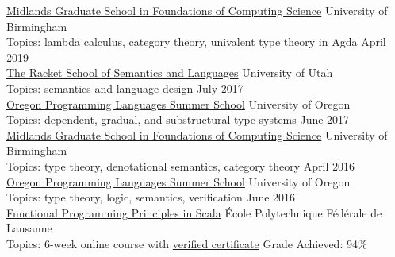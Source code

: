 \documentclass[margin,line]{resume}
\begin{document}
\begin{resume}
\newcommand\ssitem[5]{\href{#1}{#2} \hfill #3 \\ Topics: #4 \hfill #5}

\ssitem
{http://events.cs.bham.ac.uk/mgs2019/}
{Midlands Graduate School in Foundations of Computing Science}
{University of Birmingham}
{lambda calculus, category theory, univalent type theory in Agda}
{April 2019}\\[\mymedskip] %
\ssitem
{https://summer-school.racket-lang.org/2017/}
{The Racket School of Semantics and Languages}
{University of Utah}
{semantics and language design}
{July 2017}\\[\mymedskip] %
\ssitem
{https://www.cs.uoregon.edu/research/summerschool/summer17}
{Oregon Programming Languages Summer School}
{University of Oregon}
{dependent, gradual, and substructural type systems}
{June 2017}\\[\mymedskip] %
\ssitem
{http://www.cs.bham.ac.uk/~pbl/mgs2016/}
{Midlands Graduate School in Foundations of Computing Science}
{University of Birmingham}
{type theory, denotational semantics, category theory}
{April 2016}\\[\mymedskip] %
\ssitem
{https://www.cs.uoregon.edu/research/summerschool/summer16/}
{Oregon Programming Languages Summer School}
{University of Oregon}
{type theory, logic, semantics, verification}
{June 2016}\\[\mymedskip]  %
\ssitem
{https://www.coursera.org/learn/progfun1}
{Functional Programming Principles in Scala}
{\'{E}cole Polytechnique F\'{e}d\'{e}rale de Lausanne}
{6-week online course with
\href{https://www.coursera.org/account/accomplishments/records/SRLRBNFMFW86}
     {verified certificate}}
{Grade Achieved: 94\%}



    

    
    

\end{resume}
\end{document}
